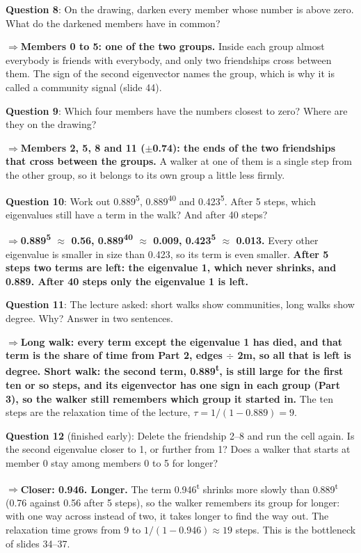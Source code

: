 \documentclass[a4paper, 14pt]{extarticle}
\newcommand{\ans}[1]{\textbf{\textcolor{pltblue!75!black}{#1}}}
\newcommand{\arrow}{\textcolor{pltblue!75!black}{$\Rightarrow$}\;}
\begin{document}
\begin{center}
\end{center}

{\bf Question 8}: On the drawing, darken every member whose number is above
zero. What do the darkened members have in common?

\begin{center}
\end{center}

\arrow \ans{Members 0 to 5: one of the two groups.} Inside each group almost
everybody is friends with everybody, and only two friendships cross between
them. The sign of the second eigenvector names the group, which is why it is
called a community signal (slide 44).

{\bf Question 9}: Which four members have the numbers closest to zero? Where
are they on the drawing?

\arrow \ans{Members 2, 5, 8 and 11 ($\pm$0.74): the ends of the two friendships
that cross between the groups.} A walker at one of them is a single step from
the other group, so it belongs to its own group a little less firmly.

{\bf Question 10}: Work out 0.889\textsuperscript{5}, 0.889\textsuperscript{40}
and 0.423\textsuperscript{5}. After 5 steps, which eigenvalues still have a
term in the walk? And after 40 steps?

\arrow \ans{0.889\textsuperscript{5} $\approx$ 0.56,
0.889\textsuperscript{40} $\approx$ 0.009, 0.423\textsuperscript{5} $\approx$
0.013.} Every other eigenvalue is smaller in size than 0.423, so its term is
even smaller. \ans{After 5 steps two terms are left: the eigenvalue 1, which
never shrinks, and 0.889. After 40 steps only the eigenvalue 1 is left.}

{\bf Question 11}: The lecture asked: short walks show communities, long walks
show degree. Why? Answer in two sentences.

\arrow \ans{Long walk: every term except the eigenvalue 1 has died, and that
term is the share of time from Part 2, edges $\div$ 2m, so all that is left is
degree. Short walk: the second term, 0.889\textsuperscript{t}, is still large
for the first ten or so steps, and its eigenvector has one sign in each group
(Part 3), so the walker still remembers which group it started in.} The ten
steps are the relaxation time of the lecture, $\tau = 1/(1-0.889) = 9$.

{\bf Question 12} (finished early): Delete the friendship 2--8 and run the cell
again. Is the second eigenvalue closer to 1, or further from 1? Does a walker
that starts at member 0 stay among members 0 to 5 for longer?

\arrow \ans{Closer: 0.946. Longer.} The term 0.946\textsuperscript{t} shrinks
more slowly than 0.889\textsuperscript{t} (0.76 against 0.56 after 5 steps),
so the walker remembers its group for longer: with one way across instead of
two, it takes longer to find the way out. The relaxation time grows from 9 to
$1/(1-0.946) \approx 19$ steps. This is the bottleneck of slides 34--37.
\end{document}
